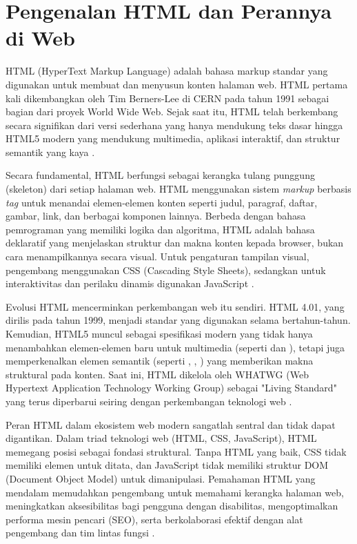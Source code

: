 ﻿\section{Pengenalan HTML dan Perannya di Web}

HTML (HyperText Markup Language) adalah bahasa markup standar yang digunakan untuk membuat dan menyusun konten halaman web. HTML pertama kali dikembangkan oleh Tim Berners-Lee di CERN pada tahun 1991 sebagai bagian dari proyek World Wide Web. Sejak saat itu, HTML telah berkembang secara signifikan dari versi sederhana yang hanya mendukung teks dasar hingga HTML5 modern yang mendukung multimedia, aplikasi interaktif, dan struktur semantik yang kaya \cite{mdnHtmlIntro}.

Secara fundamental, HTML berfungsi sebagai kerangka tulang punggung (skeleton) dari setiap halaman web. HTML menggunakan sistem \textit{markup} berbasis \textit{tag} untuk menandai elemen-elemen konten seperti judul, paragraf, daftar, gambar, link, dan berbagai komponen lainnya. Berbeda dengan bahasa pemrograman yang memiliki logika dan algoritma, HTML adalah bahasa deklaratif yang menjelaskan struktur dan makna konten kepada browser, bukan cara menampilkannya secara visual. Untuk pengaturan tampilan visual, pengembang menggunakan CSS (Cascading Style Sheets), sedangkan untuk interaktivitas dan perilaku dinamis digunakan JavaScript \cite{webdevHtml}.

Evolusi HTML mencerminkan perkembangan web itu sendiri. HTML 4.01, yang dirilis pada tahun 1999, menjadi standar yang digunakan selama bertahun-tahun. Kemudian, HTML5 muncul sebagai spesifikasi modern yang tidak hanya menambahkan elemen-elemen baru untuk multimedia (seperti  dan ), tetapi juga memperkenalkan elemen semantik (seperti , , ) yang memberikan makna struktural pada konten. Saat ini, HTML dikelola oleh WHATWG (Web Hypertext Application Technology Working Group) sebagai "Living Standard" yang terus diperbarui seiring dengan perkembangan teknologi web \cite{whatwgHtml}.

Peran HTML dalam ekosistem web modern sangatlah sentral dan tidak dapat digantikan. Dalam triad teknologi web (HTML, CSS, JavaScript), HTML memegang posisi sebagai fondasi struktural. Tanpa HTML yang baik, CSS tidak memiliki elemen untuk ditata, dan JavaScript tidak memiliki struktur DOM (Document Object Model) untuk dimanipulasi. Pemahaman HTML yang mendalam memudahkan pengembang untuk memahami kerangka halaman web, meningkatkan aksesibilitas bagi pengguna dengan disabilitas, mengoptimalkan performa mesin pencari (SEO), serta berkolaborasi efektif dengan alat pengembang dan tim lintas fungsi \cite{mdnLearn}.

